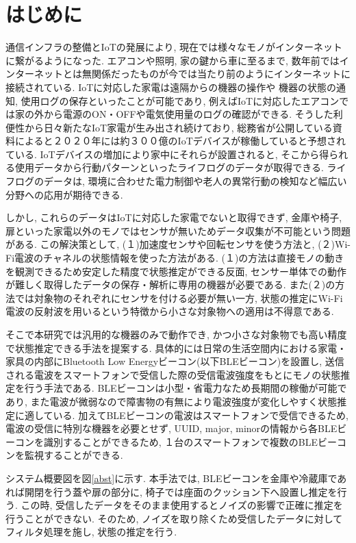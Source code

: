 \documentclass[Japanese]{dicomopapers}
\begin{document}
\section{はじめに}
通信インフラの整備とIoTの発展により, 現在では様々なモノがインターネットに繋がるようになった.
エアコンや照明, 家の鍵から車に至るまで, 数年前ではインターネットとは無関係だったものが今では当たり前のようにインターネットに接続されている.
IoTに対応した家電は遠隔からの機器の操作や 機器の状態の通知, 使用ログの保存といったことが可能であり, 例えばIoTに対応したエアコンでは家の外から電源のON・OFFや電気使用量のログの確認ができる.
そうした利便性から日々新たなIoT家電が生み出され続けており, 総務省が公開している資料\cite{soumusyo}によると２０２０年には約３００億のIoTデバイスが稼働していると予想されている.
IoTデバイスの増加により家中にそれらが設置されると, そこから得られる使用データから行動パターンといったライフログのデータが取得できる.
ライフログのデータは, 環境に合わせた電力制御や老人の異常行動の検知など幅広い分野への応用が期待できる.

しかし, これらのデータはIoTに対応した家電でないと取得できず, 金庫や椅子, 扉といった家電以外のモノではセンサが無いためデータ収集が不可能という問題がある.
この解決策として, (１)加速度センサや回転センサを使う方法と, (２)Wi-Fi電波のチャネルの状態情報を使った方法がある.
(１)の方法は直接モノの動きを観測できるため安定した精度で状態推定ができる反面, センサー単体での動作が難しく取得したデータの保存・解析に専用の機器が必要である. %
また(２)の方法では対象物のそれぞれにセンサを付ける必要が無い一方, 状態の推定にWi-Fi電波の反射波を用いるという特徴から小さな対象物への適用は不得意である.

そこで本研究では汎用的な機器のみで動作でき, かつ小さな対象物でも高い精度で状態推定できる手法を提案する.
具体的には日常の生活空間内における家電・家具の内部にBluetooth Low Energyビーコン(以下BLEビーコン)を設置し, 送信される電波をスマートフォンで受信した際の受信電波強度をもとにモノの状態推定を行う手法である.
BLEビーコンは小型・省電力なため長期間の稼働が可能であり, また電波が微弱なので障害物の有無により電波強度が変化しやすく状態推定に適している.
加えてBLEビーコンの電波はスマートフォンで受信できるため, 電波の受信に特別な機器を必要とせず, UUID, major, minorの情報から各BLEビーコンを識別することができるため, １台のスマートフォンで複数のBLEビーコンを監視することができる.

システム概要図を図\ref{abst}に示す.
本手法では, BLEビーコンを金庫や冷蔵庫であれば開閉を行う蓋や扉の部分に, 椅子では座面のクッション下へ設置し推定を行う.
この時, 受信したデータをそのまま使用するとノイズの影響で正確に推定を行うことができない.
そのため, ノイズを取り除くため受信したデータに対してフィルタ処理を施し, 状態の推定を行う.
\end{document}
